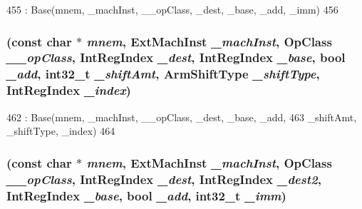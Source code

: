 \begin{DoxyCode}
455         : Base(mnem, _machInst, __opClass, _dest, _base, _add, _imm)
456     {}
\end{DoxyCode}
\hypertarget{classArmISA_1_1MemoryPostIndex_a8a56fe8fc97038f8659c3e783d58ba05}{
\subsubsection[{MemoryPostIndex}]{ (const char $\ast$ {\em mnem}, \/  ExtMachInst {\em \_\-machInst}, \/  OpClass {\em \_\-\_\-opClass}, \/  {\bf IntRegIndex} {\em \_\-dest}, \/  {\bf IntRegIndex} {\em \_\-base}, \/  bool {\em \_\-add}, \/  int32\_\-t {\em \_\-shiftAmt}, \/  {\bf ArmShiftType} {\em \_\-shiftType}, \/  {\bf IntRegIndex} {\em \_\-index})}}
\label{classArmISA_1_1MemoryPostIndex_a8a56fe8fc97038f8659c3e783d58ba05}



\begin{DoxyCode}
462         : Base(mnem, _machInst, __opClass, _dest, _base, _add,
463                 _shiftAmt, _shiftType, _index)
464     {}
\end{DoxyCode}
\hypertarget{classArmISA_1_1MemoryPostIndex_a31ed115298292436229e6b5b5afe4de1}{
\subsubsection[{MemoryPostIndex}]{ (const char $\ast$ {\em mnem}, \/  ExtMachInst {\em \_\-machInst}, \/  OpClass {\em \_\-\_\-opClass}, \/  {\bf IntRegIndex} {\em \_\-dest}, \/  {\bf IntRegIndex} {\em \_\-dest2}, \/  {\bf IntRegIndex} {\em \_\-base}, \/  bool {\em \_\-add}, \/  int32\_\-t {\em \_\-imm})}}
\label{classArmISA_1_1MemoryPostIndex_a31ed115298292436229e6b5b5afe4de1}



